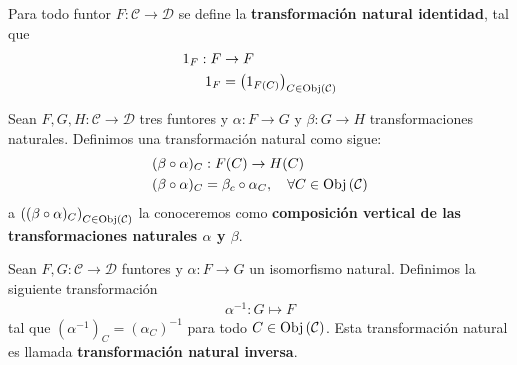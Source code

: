 \documentclass[12pt]{report}
\theoremstyle{largebreak}
\newcommand\cf[3]{\ensuremath{#1:#2\rightarrow#3}}
\newcommand{\Obj}[1]{\ensuremath{\textup{Obj}\left(#1\right)}}
\begin{document}
    \begin{exa}
        Para todo funtor $\cf{F}{\mathcal{C}}{\mathcal{D}}$ se define la \textbf{transformación natural identidad}, tal que
        \begin{equation*}
            \begin{split}
                1_F:F&\rightarrow F\\
                1_F&=\left(1_{ F(C)} \right)_{C\in\Obj{\mathcal{C}}}\\
            \end{split}
        \end{equation*}
    \end{exa}

    \begin{exa}
        Sean $\cf{F,G,H}{\mathcal{C}}{\mathcal{D}}$ tres funtores y $\cf{\alpha}{F}{G}$ y $\cf{\beta}{G}{H}$ transformaciones naturales. Definimos una transformación natural como sigue:
        \begin{equation*}
            \begin{split}
                (\beta\circ\alpha)_C&:F(C)\rightarrow H(C)\\
                (\beta\circ\alpha)_C&=\beta_c\circ\alpha_C,\quad\forall C\in\Obj{\mathcal{C}}\\
            \end{split}
        \end{equation*}
        a $\left((\beta\circ\alpha)_C \right)_{C\in\Obj{\mathcal{C}}}$ la conoceremos como \textbf{composición vertical de las transformaciones naturales $\alpha$ y $\beta$}.
    \end{exa}

    \begin{exa}
        Sean $\cf{F,G}{\mathcal{C}}{\mathcal{D}}$ funtores y $\cf{\alpha}{F}{G}$ un isomorfismo natural. Definimos la siguiente transformación
        \begin{equation*}
            \begin{split}
                \alpha^{-1}:G\mapsto F
            \end{split}
        \end{equation*}
        tal que $(\alpha^{-1})_C=(\alpha_C)^{-1}$ para todo $C\in\Obj{\mathcal{C}}$. Esta transformación natural es llamada \textbf{transformación natural inversa}.
    \end{exa}
\end{document}
